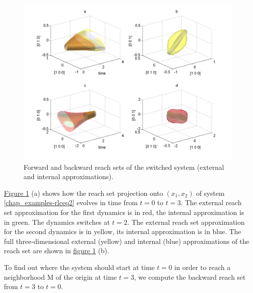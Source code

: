 \documentclass[letterpaper,10pt,english]{sphinxmanual}
\begin{document}
\begin{figure}[htbp]
\centering
\capstart

\includegraphics[width=0.800\linewidth]{chapter06_section03_rlcreach.png}
\caption{Forward and backward reach sets of the switched system
(external and internal approximations).}\label{chap_examples:rlcreachfig}\end{figure}

\hyperref[chap_examples:rlcreachfig]{Figure  \ref*{chap_examples:rlcreachfig}} (a) shows how the reach set projection onto
$(x_1, x_2)$ of system \eqref{chap_examples-rlceq2} evolves in time from $t=0$
to $t=3$. The external reach set approximation for the first
dynamics is in red, the internal approximation is in green. The dynamics
switches at $t=2$. The external reach set approximation for the
second dynamics is in yellow, its internal approximation is in blue. The
full three-dimensional external (yellow) and internal (blue)
approximations of the reach set are shown in \hyperref[chap_examples:rlcreachfig]{figure  \ref*{chap_examples:rlcreachfig}} (b).

To find out where the system should start at time $t=0$ in order
to reach a neighborhood M of the origin at time $t=3$, we compute
the backward reach set from $t=3$ to $t=0$.
\end{document}
